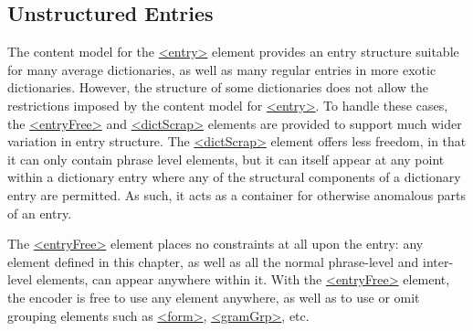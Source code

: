 \subsection[{Unstructured Entries}]{Unstructured Entries}\label{DIFR}\par
The content model for the \hyperref[TEI.entry]{<entry>} element provides an entry structure suitable for many average dictionaries, as well as many regular entries in more exotic dictionaries. However, the structure of some dictionaries does not allow the restrictions imposed by the content model for \hyperref[TEI.entry]{<entry>}. To handle these cases, the \hyperref[TEI.entryFree]{<entryFree>} and \hyperref[TEI.dictScrap]{<dictScrap>} elements are provided to support much wider variation in entry structure. The \hyperref[TEI.dictScrap]{<dictScrap>} element offers less freedom, in that it can only contain phrase level elements, but it can itself appear at any point within a dictionary entry where any of the structural components of a dictionary entry are permitted. As such, it acts as a container for otherwise anomalous parts of an entry.\par
The \hyperref[TEI.entryFree]{<entryFree>} element places no constraints at all upon the entry: any element defined in this chapter, as well as all the normal phrase-level and inter-level elements, can appear anywhere within it. With the \hyperref[TEI.entryFree]{<entryFree>} element, the encoder is free to use any element anywhere, as well as to use or omit grouping elements such as \hyperref[TEI.form]{<form>}, \hyperref[TEI.gramGrp]{<gramGrp>}, etc.\par
